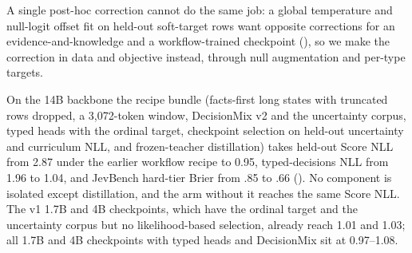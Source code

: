 A single post-hoc correction cannot do the same job: a global temperature and null-logit offset fit on
held-out soft-target rows want opposite corrections for an evidence-and-knowledge and a workflow-trained
checkpoint (), so we make the correction in data and objective instead, through null augmentation and per-type targets.

On the 14B backbone the recipe bundle (facts-first long states with truncated rows dropped, a
3{,}072-token window, DecisionMix v2 and the uncertainty corpus, typed heads with the ordinal target,
checkpoint selection on held-out uncertainty and curriculum NLL, and frozen-teacher distillation) takes
held-out Score NLL from 2.87 under the earlier workflow recipe to 0.95, typed-decisions NLL from 1.96 to
1.04, and JevBench hard-tier Brier from .85 to .66 (). No component is isolated
except distillation, and the arm without it reaches the same Score NLL. The v1 1.7B and 4B checkpoints,
which have the ordinal target and the uncertainty corpus but no likelihood-based selection, already
reach 1.01 and 1.03; all 1.7B and 4B checkpoints with typed heads and DecisionMix sit at 0.97--1.08.
